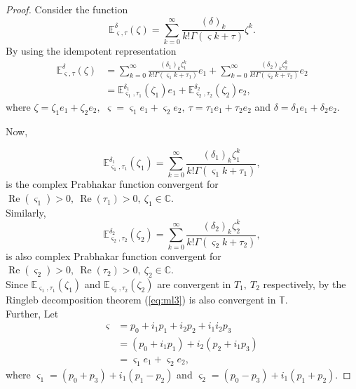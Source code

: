 \documentclass[10pt,a4paper]{amsart}
\begin{document}
\begin{proof}
Consider the function
\begin{equation}\label{eq:ml3}
\mathbb{E}_{ \varsigma,\tau}^\delta(\zeta)=\sum_{k=0}^{\infty}\frac{(\delta)_k}{k!\Gamma( \varsigma k+\tau )}\zeta^k.  \end{equation}
By using the idempotent representation
\begin{equation}\label{eq: bc ml three para}
\begin{split}
\mathbb{E}_{ \varsigma,\tau}^\delta(\zeta)&=\sum_{k=0}^{\infty}\frac{(\delta_1)_k\zeta_1^k}{k!\Gamma( \varsigma_1 k+\tau_1 )}e_1+\sum_{k=0}^{\infty}\frac{(\delta_2)_k \zeta_2^k}{k!\Gamma( \varsigma_2 k+\tau_2 )}e_2\\
&=\mathbb{E}_{ \varsigma_1,\tau_1}^{\delta_1}(\zeta_1)e_1+\mathbb{E}_{ \varsigma_2,\tau_2}^{\delta_2}(\zeta_2)e_2,
\end{split}
\end{equation}
where $\zeta=\zeta_1 e_1+\zeta_2e_2,$  $ \varsigma= \varsigma_1e_1+ \varsigma_2 e_2,~ \tau=\tau_1e_1+\tau_2e_2$ and $\delta=\delta_1e_1+\delta_2e_2.$
		
\noindent Now,		
		
\begin{equation}
\mathbb{E}_{ \varsigma_1,\tau_1}^{\delta_1}(\zeta_1)=\sum_{k=0}^{\infty}\frac{({\delta_1})_k\zeta_1^k}{k!\Gamma( \varsigma_1 k+\tau_1 )},
\end{equation}
is the  complex Prabhakar function  convergent for $\operatorname{Re}( \varsigma_1)>0 ,~\operatorname{Re}(\tau_1)>0,~\zeta_1 \in \mathbb{C}.$\\
Similarly,
\begin{equation}\label{eq cml1}
\mathbb{E}_{ \varsigma_2,\tau_2}^{\delta_2}(\zeta_2)=\sum_{k=0}^{\infty}\frac{({\delta_2})_k \zeta_2^k}{k!\Gamma( \varsigma_2 k+\tau_2 )},
\end{equation}
is also complex Prabhakar function  convergent for $\operatorname{Re}( \varsigma_2)>0,~\operatorname{Re}(\tau_2)>0 ,~\zeta_2\in \mathbb{C}.$\\
Since $ \mathbb{E}_{ \varsigma_1,\tau_1}(\zeta_1) $ and $\mathbb{E}_{ \varsigma_2,\tau_2}(\zeta_2)$ are convergent in $T_1,~T_2$ respectively, by the  Ringleb decomposition theorem  (\ref{eq:ml3}) is also convergent in $\mathbb{T}.$\\
		
\noindent Further, Let
\begin{equation}
\begin{split}
 \varsigma&= p_0+i_1p_1+ i_2p_2+i_1i_2p_3\\
&=(p_0+i_1p_1) +i_2( p_2+i_1p_3)\\
&= \varsigma_1e_1+ \varsigma_2e_2,
\end{split}
\end{equation}
where $ \varsigma_1= (p_0+p_3) +i_1(p_1-p_2)$ and $ \varsigma_2= (p_0-p_3) +i_1(p_1+p_2).$
		

\end{proof}
\end{document}
